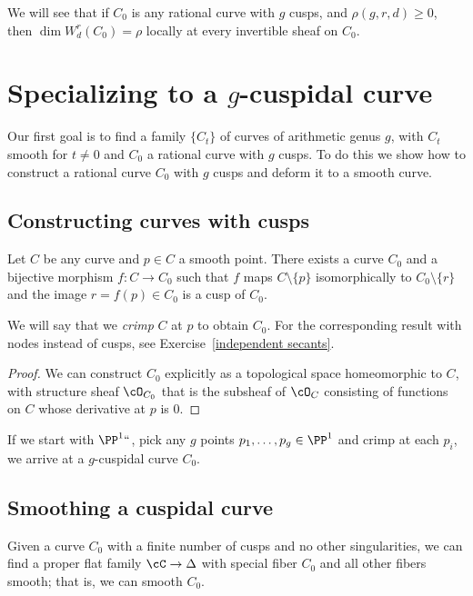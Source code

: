 We will see that if $C_{0}$ is any rational curve
with $g$ cusps, and $\rho(g,r,d)\geq 0$, then $\dim W^r_d(C_0) = \rho$
locally at every invertible sheaf on $C_{0}$.

\section{Specializing to a $g$-cuspidal curve}

Our first goal is to find a family $\{C_t\}$ of curves of arithmetic
genus $g$, with $C_t$ smooth for $t \neq 0$ and $C_0$ a rational curve
with $g$ cusps. To do this we show how to construct a rational curve $C_0$
with $g$ cusps and deform it to a smooth curve.

\subsection*{Constructing curves with cusps}

\begin{proposition}
Let $C$ be any curve and $p \in C$ a smooth point. There exists a curve
$C_0$ and a bijective morphism $f : C \to C_0$ such that  $f$ maps $C
\setminus \{p\}$ isomorphically to $C_0 \setminus \{r\}$ and the image
$r=f(p) \in C_0$ is a cusp of $C_0$.
\unif
\end{proposition}

We will say that we 
%
\emph{crimp} $C$ at $p$ to obtain $C_{0}$. For
the corresponding result with nodes instead of cusps, see
Exercise~\ref{independent secants}.

\begin{proof}
We can construct $C_0$ explicitly as a topological space homeomorphic
to $C$, with structure sheaf $\cO_{C_0}$ that is
the subsheaf of $\cO_C$ consisting of functions on $C$ whose derivative
at $p$ is 0.
\end{proof}

If we start with $\PP^1` `$, pick any $g$ points $p_1,\dots, p_g \in
\PP^1$ and crimp at each $p_i$, we arrive at a $g$-cuspidal curve $C_0$.


\subsection*{Smoothing a cuspidal curve}
Given a curve $C_0$ with a finite number of cusps and no other
singularities, we can find a proper flat family $\cC \to \Delta$ with
special fiber $C_0$ and all other fibers smooth;
that is, we can smooth $C_0$.

